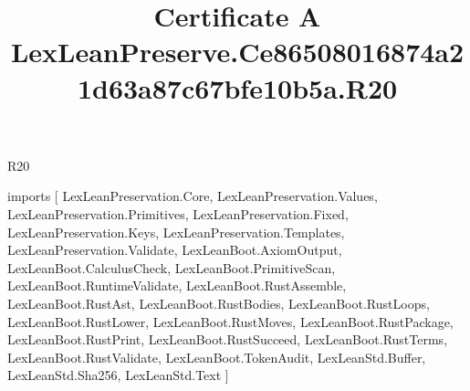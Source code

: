 \begin{lexlean}{R20}
\title{Certificate A LexLeanPreserve.Ce86508016874a21d63a87c67bfe10b5a.R20}
\begin{coremodule}
imports [
  LexLeanPreservation.Core,
  LexLeanPreservation.Values,
  LexLeanPreservation.Primitives,
  LexLeanPreservation.Fixed,
  LexLeanPreservation.Keys,
  LexLeanPreservation.Templates,
  LexLeanPreservation.Validate,
  LexLeanBoot.AxiomOutput,
  LexLeanBoot.CalculusCheck,
  LexLeanBoot.PrimitiveScan,
  LexLeanBoot.RuntimeValidate,
  LexLeanBoot.RustAssemble,
  LexLeanBoot.RustAst,
  LexLeanBoot.RustBodies,
  LexLeanBoot.RustLoops,
  LexLeanBoot.RustLower,
  LexLeanBoot.RustMoves,
  LexLeanBoot.RustPackage,
  LexLeanBoot.RustPrint,
  LexLeanBoot.RustSucceed,
  LexLeanBoot.RustTerms,
  LexLeanBoot.RustValidate,
  LexLeanBoot.TokenAudit,
  LexLeanStd.Buffer,
  LexLeanStd.Sha256,
  LexLeanStd.Text
]


\end{coremodule}
\end{lexlean}
